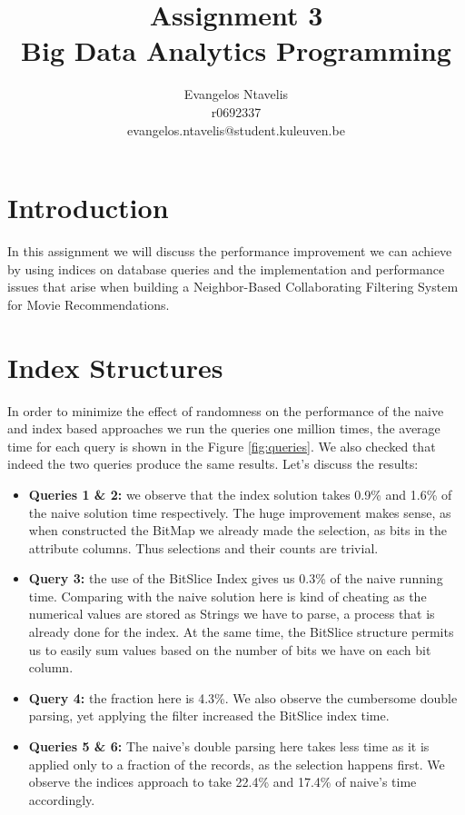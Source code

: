 \documentclass[12pt]{article}
\begin{document}
 
 
 
\title{Assignment 3\\
Big Data Analytics Programming} %
\author{Evangelos Ntavelis\\ %
r0692337 \\
evangelos.ntavelis@student.kuleuven.be}
 
\maketitle

\tableofcontents

\section{Introduction}
In this assignment we will discuss the performance improvement we can achieve by using indices on database queries and the implementation and performance issues that arise when building a Neighbor-Based Collaborating Filtering System for Movie Recommendations.


\section{Index Structures}

In order to minimize the effect of randomness on the performance of the naive and index based approaches we run the queries one million times, the average time for each query is shown in the Figure \ref{fig:queries}. We also checked that indeed the two queries produce the same results. Let's discuss the results:
\begin{itemize}
    \item \textbf{Queries 1 \& 2:} we observe that the index solution takes 0.9\% and 1.6\% of the naive solution time respectively. The huge improvement makes sense, as when constructed the BitMap we already made the selection, as bits in the attribute columns. Thus selections and their counts are trivial.
    \item \textbf{Query 3:} the use of the BitSlice Index gives us 0.3\% of the naive running time. Comparing with the naive solution here is kind of cheating as the numerical values are stored as Strings we have to parse, a process that is already done for the index. At the same time, the BitSlice structure permits us to easily sum values based on the number of bits we have on each bit column.
    \item \textbf{Query 4:} the fraction here is 4.3\%. We also observe the cumbersome double parsing, yet applying the filter increased the BitSlice index time. 
    \item \textbf{Queries 5 \& 6:} The naive's double parsing here takes less time as it is applied only to a fraction of the records, as the selection happens first. We observe the indices approach to take 22.4\% and 17.4\% of naive's time accordingly.
  \end{itemize}
\end{document}
